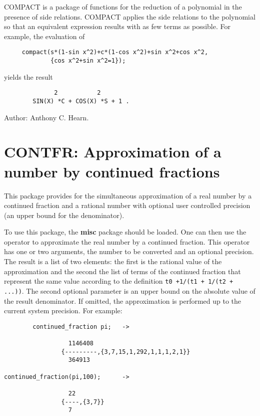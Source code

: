 COMPACT is a package of functions for the reduction of a polynomial in the
presence of side relations.  COMPACT applies the side relations to the
polynomial so that an equivalent expression results with as few terms as
possible.  For example, the evaluation of
\begin{verbatim}
     compact(s*(1-sin x^2)+c*(1-cos x^2)+sin x^2+cos x^2,
             {cos x^2+sin x^2=1});
\end{verbatim}
yields the result\pagebreak[1]
\begin{samepage}
\begin{verbatim}
              2           2
        SIN(X) *C + COS(X) *S + 1 .
\end{verbatim}

Author:  Anthony C. Hearn.
\end{samepage}

\section{CONTFR: Approximation of a number by continued fractions}

This package provides for the simultaneous approximation of a real number
by a continued fraction and a rational number with optional user
controlled precision (an upper bound for the denominator).

To use this package, the {\bf misc} package should be loaded.  One can then
use the operator  to approximate the real
number by a continued fraction.  This operator has one or two arguments, the
number to be converted and an optional precision.  The result is a list of
two elements: the first is the rational value of the approximation and the
second the list of terms of the continued fraction that represent the same
value according to the definition \verb&t0 +1/(t1 + 1/(t2 + ...))&.  The
second optional parameter  is an upper bound on the absolute
value of the result denominator.  If omitted, the approximation is performed
up to the current system precision. For example:

\begin{verbatim}
        continued_fraction pi;   ->

                  1146408
                {---------,{3,7,15,1,292,1,1,1,2,1}}
                  364913

continued_fraction(pi,100);      ->

                  22
                {----,{3,7}}
                  7
\end{verbatim}

